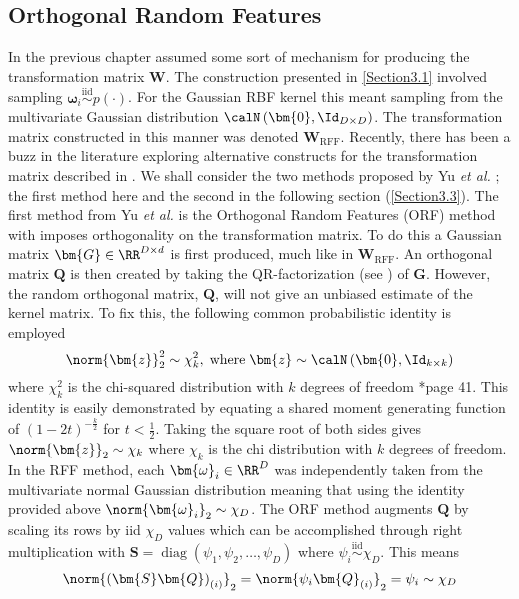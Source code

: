 \subsection{Orthogonal Random Features}\label{Section3.2}
In the previous chapter  assumed some sort of mechanism for producing the transformation matrix $\bm{W}$. The construction presented in \ref{Section3.1} involved sampling $\bm{\omega}_{i} \stackrel{\text{iid}}{\sim} p(\cdot)$. For the Gaussian RBF kernel this meant sampling from the multivariate Gaussian distribution $\calN \left( \bm{0} , \Id_{D \times D} \right)$. The transformation matrix constructed in this manner was denoted $\bm{W}_{\text{RFF}}$. Recently, there has been a buzz in the literature exploring alternative constructs for the transformation matrix described in  \cite{LiuFanghui2021RFfK}. We shall consider the two methods proposed by Yu {\it et al.} \cite{YuFelixX2016ORF}; the first method here and the second in the following section (\ref{Section3.3}). The first method from Yu {\it et al.} is the Orthogonal Random Features (ORF) method with imposes orthogonality on the transformation matrix. To do this a Gaussian matrix $\bm{G} \in \RR^{D \times d}$ is first produced, much like in $\bm{W}_{\text{RFF}}$. An orthogonal matrix $\bm{Q}$ is then created by taking the QR-factorization (see ) of $\bm{G}$. However, the random orthogonal matrix, $\bm{Q}$, will not give an unbiased estimate of the kernel matrix. To fix this, the following common probabilistic identity is employed
\[
    \norm{\bm{z}}^2_2 \sim \chi^2_k, \; \text{where} \; \bm{z} \sim \calN \left( \bm{0}, \Id_{k \times k} \right)
\]
where $\chi^2_k$ is the chi-squared distribution with $k$ degrees of freedom \cite{BrockwellPeterJ1991TSTa}*{page 41}. This identity is easily demonstrated by equating a shared moment generating function of $(1-2t)^{-\frac{k}{2}}$ for $t < \frac{1}{2}$. Taking the square root of both sides gives $\norm{\bm{z}}_2 \sim \chi_k$ where $\chi_k$ is the chi distribution with $k$ degrees of freedom. In the RFF method, each $\bm{\omega}_i \in \RR^D$ was independently taken from the multivariate normal Gaussian distribution meaning that using the identity provided above $\norm{\bm{\omega}_i}_2 \sim \chi_D$. The ORF method augments $\bm{Q}$ by scaling its rows by iid $\chi_D$ values which can be accomplished through right multiplication with $\bm{S} = \operatorname{diag} \left( \psi_1 , \psi_2 , \ldots , \psi_D \right)$ where $\psi_i \stackrel{\text{iid}}{\sim} \chi_D$. This means
\[
    \norm{\left(\bm{S} \bm{Q}\right)_{(i)}}_2 = \norm{\psi_i \bm{Q}_{(i)}}_2 = \psi_i \sim \chi_D
\]
